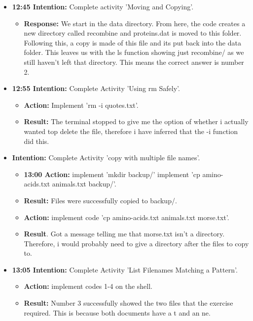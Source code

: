 \documentclass{article}
\begin{document}
\begin{itemize}
\item{\textbf{ 12:45 Intention:} Complete activity 'Moving and Copying'.}

\begin{itemize}
    \item{\textbf{Response:} We start in the data directory. From here, the code creates a new directory called recombine and proteins.dat is moved to this folder. Following this, a copy is made of this file and its put back into the data folder. This leaves us with the ls function showing just recombine/ as we still haven't left that directory. This means the correct answer is number 2.}
\end{itemize}

\item{\textbf{12:55 Intention:} Complete Activity 'Using rm Safely'.}

\begin{itemize}
\item{\textbf{Action:} Implement 'rm -i quotes.txt'.}
\item{\textbf{Result:} The terminal stopped to give me the option of whether i actually wanted top delete the file, therefore i have inferred that the -i function did this.}
\end{itemize}

\item{\textbf{Intention:} Complete Activity 'copy with multiple file names'.}

\begin{itemize}
\item{\textbf{ 13:00 Action:} implement 'mkdir backup/' implement 'cp amino-acids.txt animals.txt backup/'.}
\item{\textbf{Result:} Files were successfully copied to backup/.}
\item{\textbf{Action:} implement code 'cp amino-acids.txt animals.txt morse.txt'.}
\item{\textbf{Result}. Got a message telling me that morse.txt isn't a directory. Therefore, i would probably need to give a directory after the files to copy to.}

\end{itemize}

\item{\textbf{13:05 Intention:} Complete Activity 'List Filenames Matching a Pattern'.}

\begin{itemize}
\item{\textbf{Action:} implement codes 1-4 on the shell.}
\item{\textbf{Result:} Number 3 successfully showed the two files that the exercise required. This is because both documents have a t and an ne.}
\end{itemize}


\end{itemize}
\end{document}
